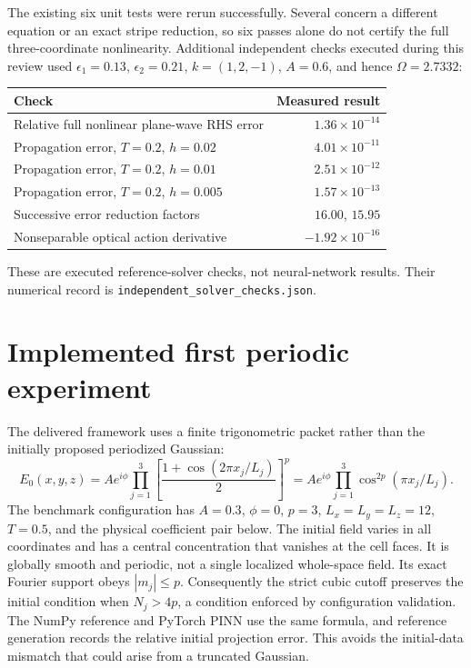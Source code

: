 \documentclass[11pt]{article}
\begin{document}
The existing six unit tests were rerun successfully. Several concern a different equation or an exact stripe reduction, so six passes alone do not certify the full three-coordinate nonlinearity. Additional independent checks executed during this review used $\epsilon_1=0.13$, $\epsilon_2=0.21$, $k=(1,2,-1)$, $A=0.6$, and hence $\Omega=2.7332$:
\begin{center}
\begin{tabular}{lr}\toprule
Check & Measured result\\\midrule
Relative full nonlinear plane-wave RHS error & $1.36\times10^{-14}$\\
Propagation error, $T=0.2$, $h=0.02$ & $4.01\times10^{-11}$\\
Propagation error, $T=0.2$, $h=0.01$ & $2.51\times10^{-12}$\\
Propagation error, $T=0.2$, $h=0.005$ & $1.57\times10^{-13}$\\
Successive error reduction factors & $16.00$, $15.95$\\
Nonseparable optical action derivative & $-1.92\times10^{-16}$\\\bottomrule
\end{tabular}
\end{center}
These are executed reference-solver checks, not neural-network results. Their numerical record is \texttt{independent\_solver\_checks.json}.

\section{Implemented first periodic experiment}
The delivered framework uses a finite trigonometric packet rather than the initially proposed periodized Gaussian:
\begin{equation}
E_0(x,y,z)=Ae^{i\phi}\prod_{j=1}^3
\left[\frac{1+\cos(2\pi x_j/L_j)}{2}\right]^p
=Ae^{i\phi}\prod_{j=1}^3\cos^{2p}(\pi x_j/L_j).
\end{equation}
The benchmark configuration has $A=0.3$, $\phi=0$, $p=3$, $L_x=L_y=L_z=12$, $T=0.5$, and the physical coefficient pair below. The initial field varies in all coordinates and has a central concentration that vanishes at the cell faces. It is globally smooth and periodic, not a single localized whole-space field. Its exact Fourier support obeys $|m_j|\leq p$. Consequently the strict cubic cutoff preserves the initial condition when $N_j>4p$, a condition enforced by configuration validation. The NumPy reference and PyTorch PINN use the same formula, and reference generation records the relative initial projection error. This avoids the initial-data mismatch that could arise from a truncated Gaussian.
\end{document}
